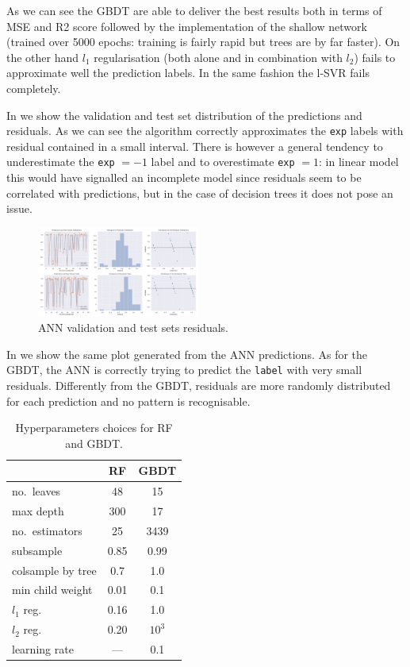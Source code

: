 As we can see the GBDT are able to deliver the best results both in
terms of MSE and R2 score followed by the implementation of the shallow
network (trained over 5000 epochs: training is fairly rapid but trees are by
far faster).
On the other hand $l_1$ regularisation (both alone and in combination with
$l_2$) fails to approximate well the prediction labels. In the same fashion the
l-SVR fails completely.

In  we show the validation and test set distribution of the
predictions and residuals.
As we can see the algorithm correctly approximates the \texttt{exp} labels with
residual contained in a small interval.
There is however a general tendency to underestimate the \texttt{exp} $= -1$
label and to overestimate \texttt{exp} $= 1$: in linear model this would have
signalled an incomplete model since residuals seem to be correlated with
predictions, but in the case of decision trees it does not pose an issue.

\begin{figure}[htbp]
  \centering
  \includegraphics[width=0.475\textwidth]{img/ann_mod}
  \caption{ANN validation and test sets residuals.}
  \label{fig:ml:ann}
\end{figure}

In  we show the same plot generated from the ANN predictions.
As for the GBDT, the ANN is correctly trying to predict the \texttt{label} with
very small residuals.
Differently from the GBDT, residuals are more randomly distributed for each
prediction and no pattern is recognisable.

\begin{table}[htbp]
\centering
\begin{tabular}{@{}lcc@{}}
\toprule
                  & \textbf{RF} & \textbf{GBDT} \\
\midrule
no.\ leaves       & 48          & 15            \\
max depth         & 300         & 17            \\
no.\ estimators   & 25          & 3439          \\
subsample         & 0.85        & 0.99          \\
colsample by tree & 0.7         & 1.0           \\
min child weight  & 0.01        & 0.1           \\
$l_1$ reg.        & 0.16        & 1.0           \\
$l_2$ reg.        & 0.20        & $10^3$        \\
learning rate     & ---         & 0.1           \\
\bottomrule
\end{tabular}%
\caption{Hyperparameters choices for RF and GBDT.}
\label{tab:ml:hyper}
\end{table}

